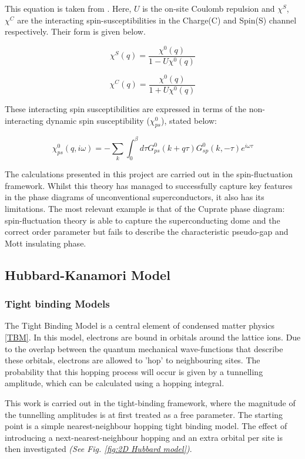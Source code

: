 \documentclass[11pt]{article}
\begin{document}
\noindent This equation is taken from \cite{migdal1958interaction}. Here, $U$ is the on-site Coulomb repulsion and $\chi^S$, $\chi^C$ are the interacting spin-susceptibilities in the Charge(C) and Spin(S) channel respectively. Their form is given below.

\begin{equation}
    \chi^S(q) = \frac{\chi^0(q)}{1 - U \chi^0 (q)}
\end{equation}

\begin{equation}
    \chi^C(q) = \frac{\chi^0(q)}{1 + U \chi^0 (q)}
\end{equation}

\noindent These interacting spin susceptibilities are expressed in terms of the non-interacting dynamic spin susceptibility ($\chi_{ps}^0$)\cite{moriya2000spin}, stated below: 

\begin{equation}\label{chi 0}
    \chi_{ps}^0(q, i \omega) = -\sum_{k} \int_{0}^{\beta} d\tau G^0_{ps}(k+q \tau) G^0_{sp}(k, -\tau)e^{i\omega \tau}
\end{equation} 

\noindent The calculations presented in this project are carried out in the spin-fluctuation framework. 
Whilst this theory has managed to successfully capture key features in the phase diagrams of unconventional superconductors, it also has its limitations.
The most relevant example is that of the Cuprate phase diagram:
spin-fluctuation theory is able to capture the superconducting dome and the correct order parameter \cite{moriya2006developments, scalapino1995case} 
but fails
to describe the characteristic pseudo-gap and Mott insulating phase\cite{timusk1999pseudogap}.


\subsection{Hubbard-Kanamori Model}

\subsubsection{Tight binding Models}

The Tight Binding Model is a central element of condensed matter physics \eqref{TBM}. In this model, electrons are bound in orbitals around the lattice ions.
Due to the overlap between the quantum mechanical wave-functions that describe these orbitals, electrons are allowed to 'hop' to neighbouring sites. The probability that this hopping process will occur is given by a tunnelling amplitude, which can be calculated using a hopping integral. \par
\medskip
\noindent This work is carried out in the tight-binding framework, where the magnitude of the tunnelling amplitudes is at first treated as a free parameter. 
The starting point is a simple nearest-neighbour hopping tight binding model. 
The effect of introducing a next-nearest-neighbour hopping and an extra orbital per site
is then investigated \textit{(See Fig. \ref{fig:2D Hubbard model})}.
\end{document}
